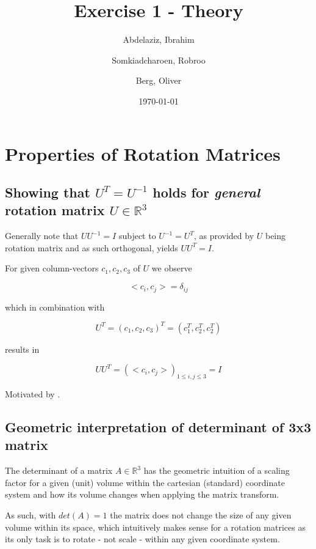 \documentclass[a4paper, twoside, english]{article}
\title{Exercise 1 - Theory}
\author{
	Abdelaziz, Ibrahim
	\and
	Somkiadcharoen, Robroo
	\and
	Berg, Oliver
}
\date{\today}
\begin{document}
\maketitle


\section{Properties of Rotation Matrices}

\subsection{Showing that $U^T = U^{-1}$ holds for \textit{general} rotation matrix $U \in \mathbb{R}^3$}

Generally note that $UU^{-1}=I$ subject to $U^{-1} = U^T$, as provided by $U$ being rotation matrix and as such orthogonal, yields $UU^T = I$.

For given column-vectors $c_1, c_2, c_3$ of $U$ we observe 

\begin{equation*}
	<c_i, c_j> = \delta_{i j}
\end{equation*}

which in combination with

\begin{equation*}
	U^T = (c_1, c_2, c_3)^T = (c_1^T, c_2^T, c_2^T)
\end{equation*}

results in

\begin{equation*}
	UU^T = (<c_i, c_j>)_{1 \le i, j \le 3} = I
\end{equation*}

Motivated by \cite{MathematicsSEMatrixTransposeIdentity}\cite{MathematicsSEMatrixTransposeIdentity2}\cite{WikiOrthogonaleMatrix}.

\subsection{Geometric interpretation of determinant of 3x3 matrix}

The determinant of a matrix $A \in \mathbb{R}^3$ has the geometric intuition of a scaling factor for a given (unit) volume within the cartesian (standard) coordinate system and how its volume changes when applying the matrix transform. \cite{3blue1brownLinAlg5Determinant}

As such, with $det(A) = 1$ the matrix does not change the size of any given volume within its space, which intuitively makes sense for a rotation matrices as its only task is to rotate - not scale - within any given coordinate system.
\end{document}
